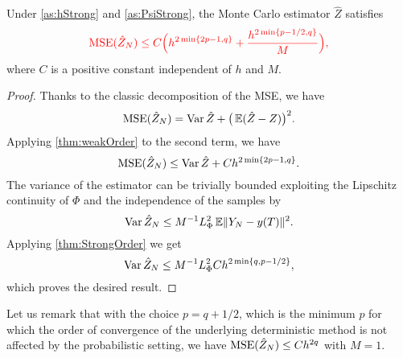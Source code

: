 \documentclass[final,onefignum,onetabnum]{siamonline171218}
\begin{document}
\begin{theorem}\label{thm:MSEMonteCarlo} Under \cref{as:hStrong} and \cref{as:PsiStrong}, the Monte Carlo estimator $\hat Z$ satisfies
	\begin{equation}\label{eq:MSEBound}
		\corr{\MSE(\hat Z_N) \leq C\Big(h^{2\min\{2p - 1, q\}} + \frac{h^{2\min\{p-1/2, q\}}}{M}\Big),}
	\end{equation}
	where $C$ is a positive constant independent of $h$ and $M$.
\end{theorem}
\begin{proof} Thanks to the classic decomposition of the MSE, we have
	\begin{equation}\label{eq:MSEDecomposition}
		\MSE(\hat Z_N) = \Var \hat Z  + \big(\E(\hat Z - Z)\big)^2.
	\end{equation}
	Applying \cref{thm:weakOrder} to the second term, we have
	\begin{equation}\label{eq:MSEWeakOrder}
		\MSE(\hat Z_N) \leq \Var \hat Z  + Ch^{2\min\{2p-1, q\}}.
	\end{equation}
	The variance of the estimator can be trivially bounded exploiting the Lipschitz continuity of $\Phi$ and the independence of the samples by
	\begin{equation}\label{eq:MSELipschitz}
		\Var\hat Z_N \leq M^{-1} L_\Phi^2 \E \norm{Y_N - y(T)}^2.
	\end{equation}
	Applying \cref{thm:StrongOrder} we get
	\begin{equation}
		\operatorname{Var}\hat Z_N \leq M^{-1} L_\Phi^2 Ch^{2\min\{q, p-1/2\}},
	\end{equation}
	which proves the desired result.
\end{proof}
Let us remark that with the choice $p = q + 1/2$, which is the minimum $p$ for which the order of convergence of the underlying deterministic method is not affected by the probabilistic setting, we have $\operatorname{MSE}(\hat Z_N) \leq Ch^{2q}$ with $M = 1$.  
\end{document}
